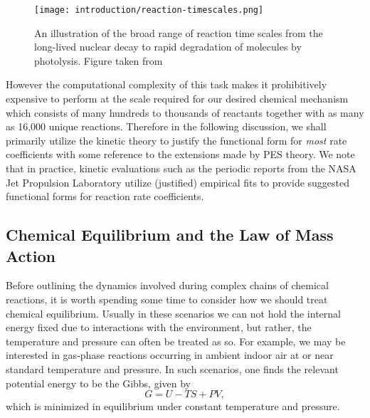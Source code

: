 \begin{figure}[h]
  \centering
  \texttt{[image: introduction/reaction-timescales.png]}
  \caption{An illustration of the broad range of reaction time scales from the long-lived nuclear decay to rapid degradation of molecules by photolysis. Figure taken from \cite{arnaut2006chemical}}
  \label{fig:reaction-timescales}
\end{figure}


However the computational complexity of this task makes it prohibitively expensive to perform at the scale required for our desired chemical mechanism which consists of many hundreds to thousands of reactants together with as many as 16,000 unique reactions. Therefore in the following discussion, we shall primarily utilize the kinetic theory to justify the functional form for \textit{most} rate coefficients with some reference to the extensions made by PES theory. We note that in practice, kinetic evaluations such as the periodic reports from the NASA Jet Propulsion Laboratory \cite{jpl-kinetic-evaluation-2020} utilize (justified) empirical fits to provide suggested functional forms for reaction rate coefficients.

\subsection{Chemical Equilibrium and the Law of Mass Action}

Before outlining the dynamics involved during complex chains of chemical reactions, it is worth spending some time to consider how we should treat chemical equilibrium. Usually in these scenarios we can not hold the internal energy fixed due to interactions with the environment, but rather, the temperature and pressure can often be treated as so. For example, we may be interested in gas-phase reactions occurring in ambient indoor air at or near standard temperature and pressure. In such scenarios, one finds the relevant potential energy to be the Gibbs, given by
\begin{equation}
  G = U - TS + PV,
\end{equation}
which is minimized in equilibrium under constant temperature and pressure.

